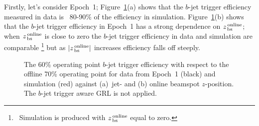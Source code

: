 \newpage

Firstly, let's consider Epoch~1;
Figure~\ref{fig:Epoch1_eff}(a) shows that the $b$-jet trigger efficiency measured in data is ~80-90\% of the efficiency in simulation.
Figure~\ref{fig:Epoch1_eff}(b) shows that the $b$-jet trigger efficiency in Epoch~1 has a strong dependence on $z_{\,\text{bs}}^{\text{\,online}}$;
when $z_{\,\text{bs}}^{\text{\,online}}$ is close to zero the $b$-jet trigger efficiency in data and simulation are comparable
\footnote{\ Simulation is produced with $z_{\,\text{bs}}^{\text{\,online}}$ equal to zero.}
but as $|z_{\,\text{bs}}^{\text{\,online}}|$ increases efficiency falls off steeply.

\begin{figure}[!htb]
  \begin{center}
    \captionsetup[subfigure]{aboveskip=0pt,justification=centering}
    \hspace{-0.5cm}
  \end{center}
  \vspace{-1em}
  \caption[The $b$-jet trigger efficiency 
    for data from Epoch~1 and simulation against jet-\pT{} and online beamspot $z$-position.
    The $b$-jet trigger aware GRL is not applied.]
          {The 60\% operating point $b$-jet trigger efficiency with respect to the offline 70\% operating point
            for data from Epoch~1 (black) and simulation (red) against (a)~jet-\pT{} and (b) online beamspot $z$-position.
            The $b$-jet trigger aware GRL is not applied.}
          \label{fig:Epoch1_eff}
            \vspace{-0.5em}

\end{figure}

